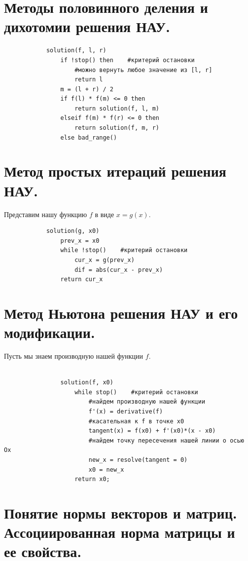 \documentclass[16pt]{article}
\begin{document}
		\section{Методы половинного деления и дихотомии решения НАУ.}
			\begin{verbatim}
            solution(f, l, r)
                if !stop() then    #критерий остановки
                    #можно вернуть любое значение из [l, r] 
                    return l    
                m = (l + r) / 2
                if f(l) * f(m) <= 0 then
                    return solution(f, l, m)
                elseif f(m) * f(r) <= 0 then
                    return solution(f, m, r)
                else bad_range()
			\end{verbatim}
		\section{Метод простых итераций решения НАУ.}\label{sec:simple}
            Представим нашу функцию $f$ в виде $x = g(x)$.
            \begin{verbatim}
            solution(g, x0)
                prev_x = x0
                while !stop()    #критерий остановки
                    cur_x = g(prev_x)
                    dif = abs(cur_x - prev_x)
                return cur_x 
            \end{verbatim}
		\section{Метод Ньютона решения НАУ и его модификации.}
            Пусть мы знаем производную нашей функции $f$.
		    \\ \\ %
            \begin{verbatim}
                solution(f, x0)
                    while stop()    #критерий остановки
                        #найдем производную нашей функции 
                        f'(x) = derivative(f)    
                        #касательная к f в точке x0
                        tangent(x) = f(x0) + f'(x0)*(x - x0)
                        #найдем точку пересечения нашей линии о осью Ox    
                        new_x = resolve(tangent = 0) 
                        x0 = new_x
                    return x0;                    
            \end{verbatim}
		\section{Понятие нормы векторов и матриц. Ассоциированная норма матрицы и ее свойства.}
\end{document}
